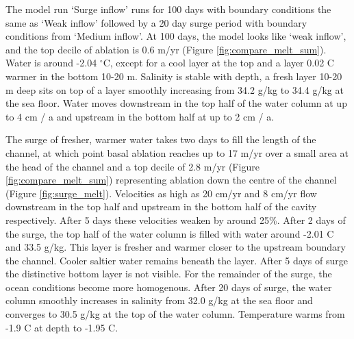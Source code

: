 The model run `Surge inflow' runs for 100 days with boundary conditions the same as `Weak inflow' followed by a 20 day surge period with boundary conditions from `Medium inflow'. At 100 days, the model looks like `weak inflow', and the top decile of ablation is 0.6 m/yr (Figure \ref{fig:compare_melt_sum}). Water is around -2.04 $^{\circ}$C, except for a cool layer at the top and a layer 0.02 \textdegree C warmer in the bottom 10-20 m. Salinity is stable with depth, a fresh layer 10-20 m deep sits on top of a layer smoothly increasing from 34.2 g/kg to 34.4 g/kg at the sea floor. Water moves downstream in the top half of the water column at up to 4 cm / a and upstream in the bottom half at up to 2 cm / a. 

The surge of fresher, warmer water takes two days to fill the length of the channel, at which point basal ablation reaches up to 17 m/yr over a small area at the head of the channel and a top decile of 2.8 m/yr (Figure \ref{fig:compare_melt_sum}) representing ablation down the centre of the channel (Figure \ref{fig:surge_melt}). Velocities as high as 20 cm/yr and 8 cm/yr flow downstream in the top half and upstream in the bottom half of the cavity respectively. After 5 days these velocities weaken by around 25\%. After 2 days of the surge, the top half of the water column is filled with water around -2.01 \textdegree C and 33.5 g/kg. This layer is fresher and warmer closer to the upstream boundary the channel. Cooler saltier water remains beneath the layer. After 5 days of surge  the distinctive bottom layer is not visible. For the remainder of the surge, the ocean conditions become more homogenous. After 20 days of surge, the water column smoothly increases in salinity from  32.0 g/kg at the sea floor and converges to 30.5 g/kg at the top of the water column. Temperature warms from -1.9  \textdegree C at depth to -1.95 \textdegree C.

